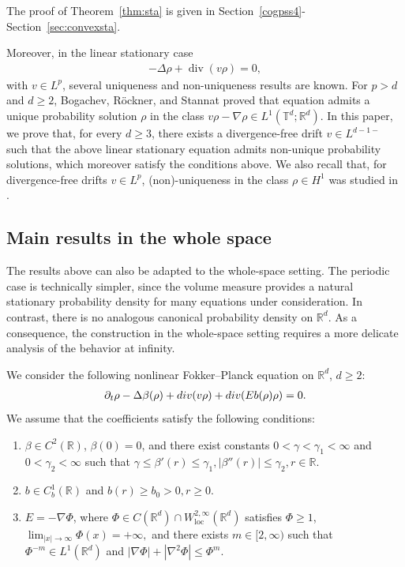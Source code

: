 \documentclass[10pt,a4paper]{amsart}
\numberwithin{equation}{section}
\def\geq{\geqslant}
\def\leq{\leqslant}
\def\div{\mathord{{\rm div}}}
\def\geq{\geqslant}
\def\leq{\leqslant}
\def\div{\mathord{{\rm div}}}
\begin{document}
The proof of Theorem~\ref{thm:sta} is given in Section~\ref{cogpss4}- Section~\ref{sec:convexsta}.


Moreover, in the linear stationary case
\begin{align*}
-\Delta\rho+\operatorname{div}(v\rho)=0,
\end{align*}
with $v\in L^p $, several uniqueness and
non-uniqueness results are known. For $p>d$ and $d\geq 2$, Bogachev,
R\"ockner, and Stannat \cite{BRS02} proved  that equation admits a unique
probability solution $\rho$ in the class $v\rho-\nabla\rho\in L^1 (\mathbb{T}^d;\mathbb{R}^d)$.
In this paper, we prove that, for every $d\geq 3$, there
exists a divergence-free drift
$
v\in L^{d-1-} 
$
such that the above linear stationary equation admits non-unique probability
solutions, which moreover satisfy the conditions above.   We also recall that, for divergence-free drifts
$v\in L^p $, (non)-uniqueness in the class
$\rho\in H^1 $ was studied in \cite{Zhi04,CO22}.

   

\subsection{Main results in the whole space}\label{sec:rcase}
The results above can also be adapted to the whole-space setting. The
periodic case is technically simpler, since the  volume measure
provides a natural stationary probability density for many equations under
consideration. In contrast, there is no analogous canonical probability
density on $\mathbb{R}^d$. As a consequence, the construction in the
whole-space setting requires a more delicate analysis of the behavior at
infinity.

We consider the following nonlinear Fokker--Planck equation on
$\mathbb{R}^d$, $d\geq 2$:
\begin{align}
\partial_t\rho
-
\Delta 
\beta(\rho)  
+
\div(v\rho)
+
\div(Eb(\rho)\rho)
=
0 .
\label{R:eq:fpe}
\end{align}
We assume that the coefficients satisfy the following conditions:
\begin{enumerate}
    \item[(a)] $\beta\in C^2(\mathbb{R})$, $\beta(0)=0$, and there exist
    constants $0<\gamma<\gamma_1<\infty$ and $0<\gamma_2<\infty$ such that
   $
    \gamma\leq \beta'(r)\leq \gamma_1,
    |\beta''(r)|\leq \gamma_2,
    r\in\mathbb{R}.
 $

    \item[(b)] $b\in C_b^1(\mathbb{R})$ and
   $
    b(r)\geq b_0>0,
    r\geq 0 .
   $

    \item[(c)] $E=-\nabla\Phi$, where
    $\Phi\in C(\mathbb{R}^d)\cap W^{2,\infty}_{\mathrm{loc}}(\mathbb{R}^d)$
    satisfies $\Phi\geq 1$,
    $
    \lim_{|x|\to\infty}\Phi(x)=+\infty,
     $
    and there exists $m\in[2,\infty)$ such that
    $\Phi^{-m}\in L^1(\mathbb{R}^d)$ and
    $
    |\nabla\Phi|+|\nabla^2\Phi|
    \leq
    \Phi^m .
    $
\end{enumerate}
\end{document}
